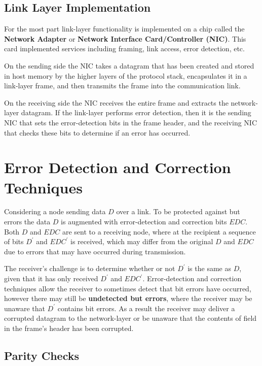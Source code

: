 \documentclass[12pt letter]{report}
\begin{document}
\section{Link Layer Implementation}

For the most part link-layer functionality is implemented on a chip
called the \textbf{Network Adapter} or \textbf{Network Interface
Card/Controller (NIC)}. This card implemented services including
framing, link access, error detection, etc.

On the sending side the NIC takes a datagram that has been created
and stored in host memory by the higher layers of the protocol stack,
encapsulates it in a link-layer frame, and then transmits the frame
into the communication link.

On the receiving side the NIC receives the entire frame and extracts
the network-layer datagram. If the link-layer performs error
detection, then it is the sending NIC that sets the error-detection
bits in the frame header, and the receiving NIC that checks these
bits to determine if an error has occurred.

\chapter{Error Detection and Correction Techniques}

Considering a node sending data $D$ over a link. To be protected
against but errors the data $D$ is augmented with error-detection and
correction bits $EDC$. Both $D$ and $EDC$ are sent to a receiving
node, where at the recipient a sequence of bits $D^{\prime}$ and
$EDC^{\prime}$ is received, which may differ from the original $D$
and $EDC$ due to errors that may have occurred during transmission.

The receiver's challenge is to determine whether or not $D^{\prime}$
is the same as $D$, given that it has only received $D^{\prime}$ and
$EDC^{\prime}$. Error-detection and correction techniques allow the
receiver to sometimes detect that bit errors have occurred, however
there may still be \textbf{undetected but errors}, where the receiver
may be unaware that $D^{\prime}$ contains bit errors. As a result the
receiver may deliver a corrupted datagram to the network-layer or be
unaware that the contents of field in the frame's header has been corrupted.

\section{Parity Checks}
\end{document}
